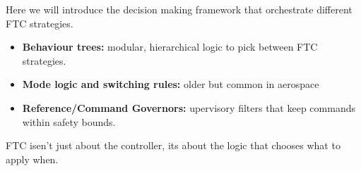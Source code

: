 Here we will introduce the decision making framework that orchestrate different FTC strategies.


\begin{itemize}
    \item \textbf{Behaviour trees:} modular, hierarchical logic to pick between FTC strategies.

    \item \textbf{Mode logic and switching rules:} older but common in aerospace

    \item  \textbf{Reference/Command Governors:} upervisory filters that keep commands within safety bounds.
\end{itemize}

FTC isen't just about the controller, its about the logic that chooses what to apply when.